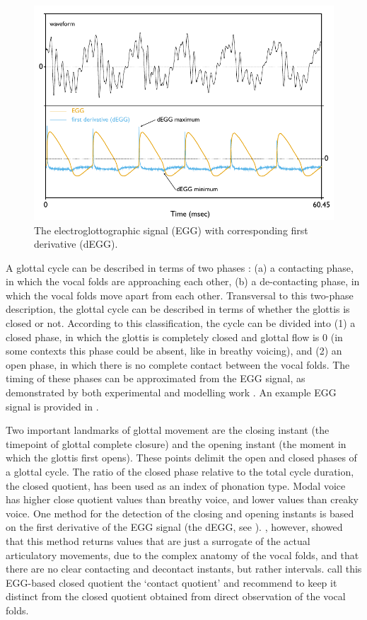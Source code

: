 \documentclass[
  11pt,
  a4paper,
]{article}
\begin{document}
\begin{figure}
  \centering
  \includegraphics{./img/degg-signal.pdf}
  \caption{The electroglottographic signal (EGG) with corresponding first derivative (dEGG).}
  \label{f:egg}
\end{figure}

A glottal cycle can be described in terms of two phases
\citep{childers1985, hampala2016}: (a) a contacting phase, in which the
vocal folds are approaching each other, (b) a de-contacting phase, in
which the vocal folds move apart from each other. Transversal to this
two-phase description, the glottal cycle can be described in terms of
whether the glottis is closed or not. According to this classification,
the cycle can be divided into (1) a closed phase, in which the glottis
is completely closed and glottal flow is 0 (in some contexts this phase
could be absent, like in breathy voicing), and (2) an open phase, in
which there is no complete contact between the vocal folds. The timing
of these phases can be approximated from the EGG signal, as demonstrated
by both experimental and modelling work \citep{hampala2016}. An example
EGG signal is provided in .

Two important landmarks of glottal movement are the closing instant (the
timepoint of glottal complete closure) and the opening instant (the
moment in which the glottis first opens). These points delimit the open
and closed phases of a glottal cycle. The ratio of the closed phase
relative to the total cycle duration, the closed quotient, has been used
as an index of phonation type. Modal voice has higher close quotient
values than breathy voice, and lower values than creaky voice. One
method for the detection of the closing and opening instants is based on
the first derivative of the EGG signal (the dEGG, see ).
\citet{herbst2017}, however, showed that this method returns values that
are just a surrogate of the actual articulatory movements, due to the
complex anatomy of the vocal folds, and that there are no clear
contacting and decontact instants, but rather intervals.
\citet{herbst2017} call this EGG-based closed quotient the `contact
quotient' and recommend to keep it distinct from the closed quotient
obtained from direct observation of the vocal folds.
\end{document}
